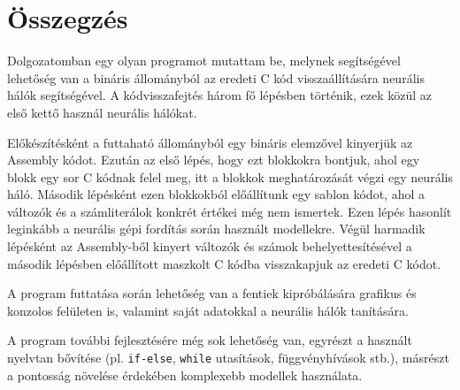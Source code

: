 \chapter{Összegzés}
\label{ch:sum}
Dolgozatomban egy olyan programot mutattam be, melynek segítségével lehetőség van
a bináris állományból az eredeti C kód visszaállítására neurális hálók segítségével.
A kódvisszafejtés három fő lépésben történik, ezek közül az első kettő használ
neurális hálókat.

Előkészítésként a futtaható állományból egy bináris elemzővel kinyerjük az Assembly kódot.
Ezután az első lépés, hogy ezt blokkokra bontjuk, ahol egy blokk egy sor C kódnak felel meg,
itt a blokkok meghatározását végzi egy neurális háló. Második lépésként ezen blokkokból előállítunk
egy sablon kódot, ahol a változók és a számliterálok konkrét értékei még nem ismertek. Ezen lépés
hasonlít leginkább a neurális gépi fordítás során használt modellekre. Végül harmadik lépésként az
Assembly-ből kinyert változók és számok behelyettesítésével a második lépésben előállított maszkolt C
kódba visszakapjuk az eredeti C kódot.

A program futtatása során lehetőség van a fentiek kipróbálására grafikus és konzolos felületen is,
valamint saját adatokkal a neurális hálók tanítására.

A program további fejlesztésére még sok lehetőség van, egyrészt a használt nyelvtan bővítése
(pl. \texttt{if-else}, \texttt{while} utasítások, függvényhívások stb.), másrészt a pontosság
növelése érdekében komplexebb modellek használata.

